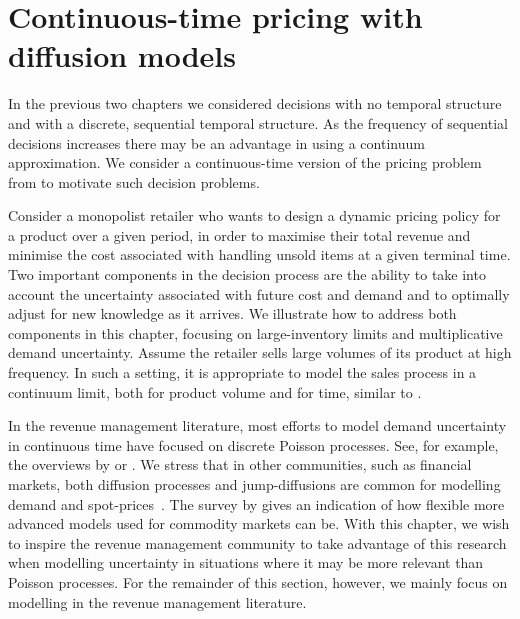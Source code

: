 \documentclass[main.tex]{subfiles}
\begin{document}
\chapter{Continuous-time pricing with diffusion
  models}\label{ch:cts_control}

In the previous two chapters we considered decisions with no temporal
structure and with a discrete, sequential temporal structure.
As the frequency of sequential decisions increases there may be an
advantage in using a continuum approximation.
We consider a continuous-time version of the pricing problem from
 to motivate such decision problems.

Consider a monopolist retailer who wants to design a dynamic pricing policy
for a product over a given period, in order to maximise their total
revenue and minimise the cost associated with handling unsold items
at a given terminal time.
Two important components in the decision process are the ability to
take into account the uncertainty associated with future cost and demand and to
optimally adjust for new knowledge as it arrives.
We illustrate how to address both components in this chapter,
focusing on large-inventory limits and multiplicative demand
uncertainty.
Assume the retailer sells large volumes of its product at
high frequency. In such a setting, it is
appropriate to model the sales process in a continuum limit, both for
product volume and for time, similar to \citet{kalish1983monopolist}.

In the revenue management literature, most efforts to model demand uncertainty in
continuous time have focused on discrete Poisson
processes. See, for example, the overviews by \citet{bitran2003overview}
or \citet{aviv2012dynamic}.
We stress that in other communities, such as financial markets,
both diffusion processes and jump-diffusions are common for modelling
demand and spot-prices~\citep{benth2014stochastic}. The survey by \citet{carmona2014survey}
gives an indication of how flexible more advanced models used for commodity
markets can be. With this chapter, we wish to inspire the revenue
management community to take advantage of this research when modelling
uncertainty in situations where it may be more relevant than Poisson
processes. For the remainder of this section,
however, we mainly focus on modelling in the revenue management literature.
\end{document}

